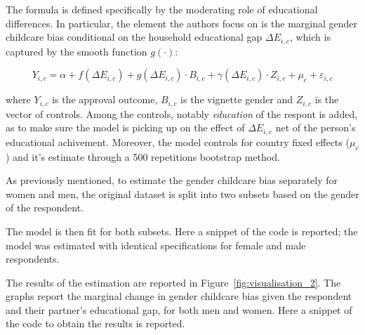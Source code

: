 \documentclass[12pt,letterpaper]{article}
\begin{document}
\noindent The formula is defined specifically by the moderating role of educational 
differences. In particular, the element the authors focus on is the marginal gender childcare bias conditional on the household educational gap $\Delta E_{i,c}$, which is captured by the smooth function $g(\cdot)$:

\begin{equation}
	Y_{i,c} = \alpha + f(\Delta E_{i,c}) + g(\Delta E_{i,c}) \cdot B_{i,c} 
	+ \gamma(\Delta E_{i,c}) \cdot Z_{i,c} + \mu_c + \varepsilon_{i,c}
	\label{eq:kernel}
\end{equation}

\noindent where $Y_{i,c}$ is the approval outcome, $B_{i,c}$ is the vignette gender and $Z_{i,c}$ is the vector of controls. Among the controls, notably \textit{education} of the respont is added, as to make sure the model is picking up on the effect of $\Delta E_{i,c}$ net of the person's educational achivement. Moreover, the model controls for country fixed effects ($\mu_c$) and it's estimate through a 500 repetitions bootstrap method. 

\vspace{0.5cm}


\vspace{0.5cm}
\noindent As previously mentioned, to estimate the gender childcare bias separately for women and men, the original dataset is split into two subsets based on the gender of the respondent.

\vspace{0.5cm}

\vspace{0.5cm}

\noindent The model is then fit for both subsets. Here a snippet of the code is reported; the model was estimated with identical specifications for female and male respondents.

\vspace{0.5cm}

\vspace{0.5cm}

\noindent The results of the estimation are reported in Figure~\ref{fig:visualisation_2}. The graphs report the marginal change in gender childcare bias given the respondent and their partner's educational gap, for both men and women.
\noindent Here a snippet of the code to obtain the results is reported.
\end{document}
